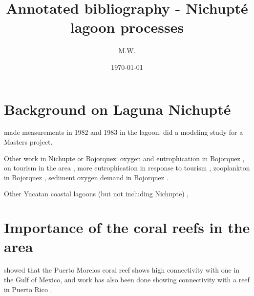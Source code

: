 \documentclass[11pt]{article}
\begin{document}
\title{Annotated bibliography - Nichupt{\'e} lagoon processes}
\author{M.W.}
\date{\today}
\maketitle

\section*{Background on Laguna Nichupt{\'e}}

\citet{merino90} made measurements in 1982 and 1983 in the lagoon. \citet{pedrozoacuna08} did a modeling study for a Masters project. 

Other work in Nichupte or Bojorquez: oxygen and eutrophication in Bojorquez \citep{reyes91}, on tourism in the area \citep{torres05}, more eutrophication in response to tourism \citep{merino92}, zooplankton in Bojorquez \citep{alvarezcadena96}, sediment oxygen demand in Bojorquez \citep{valdeslozano06}.

Other Yucatan coastal lagoons (but not including Nichupte) \citep{herrerasilveria98}, 


\section*{Importance of the coral reefs in the area}

\citet{villegassanchez14} showed that the Puerto Morelos coral reef shows high connectivity with one in the Gulf of Mexico, and work has also been done showing connectivity with a reef in Puerto Rico \citep{labastidaestrada14}.





{}

\end{document}
